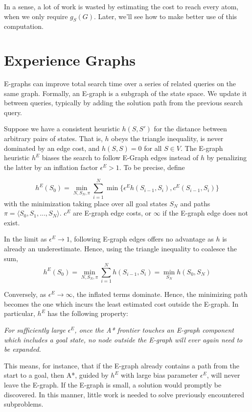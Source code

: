 \documentclass[letterpaper]{article}
\begin{document}
In a sense, a lot of work is wasted by estimating the cost to reach every atom, when we only require $g_S(G)$.
Later, we'll see how to make better use of this computation.

\section{Experience Graphs}

E-graphs can improve total search time over a series of related queries on the same graph.
Formally, an E-graph is a subgraph of the state space.
We update it between queries, typically by adding the solution path from the previous search query.

Suppose we have a consistent heuristic $h(S,S')$ for the distance between arbitrary pairs of states.
That is, $h$ obeys the triangle inequality, is never dominated by an edge cost, and $h(S,S) = 0$ for all $S\in V$.
The E-graph heuristic $h^E$ biases the search to follow E-Graph edges instead of $h$ by penalizing the latter by an inflation factor $\epsilon^E > 1$.
To be precise, define

\[h^E(S_0) = \min_{N,S_N,\pi} \sum_{i=1}^N \min \{\epsilon^E h(S_{i-1},S_i),c^E(S_{i-1},S_i)\}\]
with the minimization taking place over all goal states $S_N$ and paths $\pi = \langle S_0,S_1,...,S_N \rangle$. $c^E$ are E-graph edge costs, or $\infty$ if the E-graph edge does not exist.

In the limit as $\epsilon^E \rightarrow 1$, following E-graph edges offers no advantage as $h$ is already an underestimate. Hence, using the triangle inequality to coalesce the sum,
\[h^E(S_0) = \min_{N,S_N,\pi} \sum_{i=1}^N h(S_{i-1},S_i) = \min_{S_N} h(S_0,S_N)\]

Conversely, as $\epsilon^E \rightarrow\infty$, the inflated terms dominate. Hence, the minimizing path becomes the one which incurs the least estimated cost outside the E-graph. In particular, $h^E$ has the following property:

\textit{For sufficiently large $\epsilon^E$, once the A* frontier touches an E-graph component which includes a goal state, no node outside the E-graph will ever again need to be expanded.}

This means, for instance, that if the E-graph already contains a path from the start to a goal, then A*, guided by $h^E$ with large bias parameter $\epsilon^E$, will never leave the E-graph.
If the E-graph is small, a solution would promptly be discovered.
In this manner, little work is needed to solve previously encountered subproblems.
\end{document}
